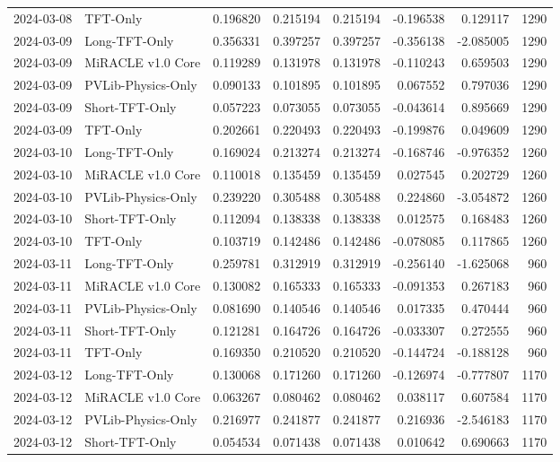 \begin{tabular}{llrrrrrr}
2024-03-08 & TFT-Only & 0.196820 & 0.215194 & 0.215194 & -0.196538 & 0.129117 & 1290 \\
2024-03-09 & Long-TFT-Only & 0.356331 & 0.397257 & 0.397257 & -0.356138 & -2.085005 & 1290 \\
2024-03-09 & MiRACLE v1.0 Core & 0.119289 & 0.131978 & 0.131978 & -0.110243 & 0.659503 & 1290 \\
2024-03-09 & PVLib-Physics-Only & 0.090133 & 0.101895 & 0.101895 & 0.067552 & 0.797036 & 1290 \\
2024-03-09 & Short-TFT-Only & 0.057223 & 0.073055 & 0.073055 & -0.043614 & 0.895669 & 1290 \\
2024-03-09 & TFT-Only & 0.202661 & 0.220493 & 0.220493 & -0.199876 & 0.049609 & 1290 \\
2024-03-10 & Long-TFT-Only & 0.169024 & 0.213274 & 0.213274 & -0.168746 & -0.976352 & 1260 \\
2024-03-10 & MiRACLE v1.0 Core & 0.110018 & 0.135459 & 0.135459 & 0.027545 & 0.202729 & 1260 \\
2024-03-10 & PVLib-Physics-Only & 0.239220 & 0.305488 & 0.305488 & 0.224860 & -3.054872 & 1260 \\
2024-03-10 & Short-TFT-Only & 0.112094 & 0.138338 & 0.138338 & 0.012575 & 0.168483 & 1260 \\
2024-03-10 & TFT-Only & 0.103719 & 0.142486 & 0.142486 & -0.078085 & 0.117865 & 1260 \\
2024-03-11 & Long-TFT-Only & 0.259781 & 0.312919 & 0.312919 & -0.256140 & -1.625068 & 960 \\
2024-03-11 & MiRACLE v1.0 Core & 0.130082 & 0.165333 & 0.165333 & -0.091353 & 0.267183 & 960 \\
2024-03-11 & PVLib-Physics-Only & 0.081690 & 0.140546 & 0.140546 & 0.017335 & 0.470444 & 960 \\
2024-03-11 & Short-TFT-Only & 0.121281 & 0.164726 & 0.164726 & -0.033307 & 0.272555 & 960 \\
2024-03-11 & TFT-Only & 0.169350 & 0.210520 & 0.210520 & -0.144724 & -0.188128 & 960 \\
2024-03-12 & Long-TFT-Only & 0.130068 & 0.171260 & 0.171260 & -0.126974 & -0.777807 & 1170 \\
2024-03-12 & MiRACLE v1.0 Core & 0.063267 & 0.080462 & 0.080462 & 0.038117 & 0.607584 & 1170 \\
2024-03-12 & PVLib-Physics-Only & 0.216977 & 0.241877 & 0.241877 & 0.216936 & -2.546183 & 1170 \\
2024-03-12 & Short-TFT-Only & 0.054534 & 0.071438 & 0.071438 & 0.010642 & 0.690663 & 1170 \\

\end{tabular}
